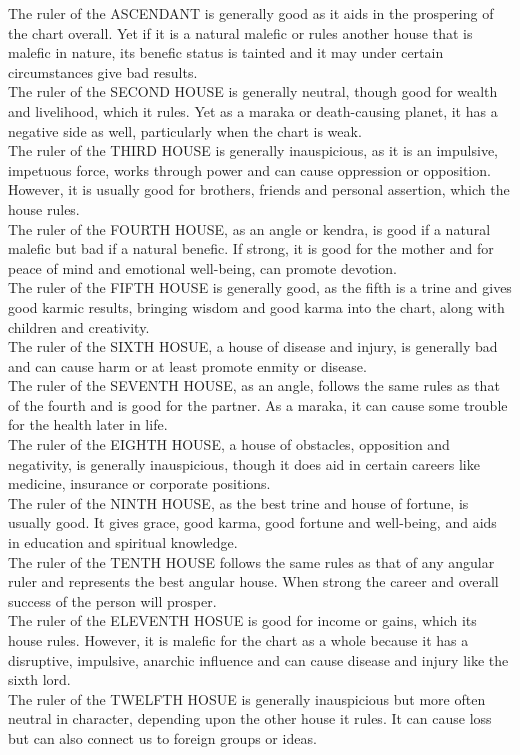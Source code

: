 The ruler of the ASCENDANT is generally good as it aids in the prospering of the chart overall. Yet if it is a natural malefic or rules another house that is malefic in nature, its benefic status is tainted and it may under certain circumstances give bad results. \\
The ruler of the SECOND HOUSE is generally neutral, though good for wealth and livelihood, which it rules. Yet as a maraka or death-causing planet, it has a negative side as well, particularly when the chart is weak.\\
The ruler of the THIRD HOUSE is generally inauspicious, as it is an impulsive, impetuous force, works through power and can cause oppression or opposition. However, it is usually good for brothers, friends and personal assertion, which the house rules.\\
The ruler of the FOURTH HOUSE, as an angle or kendra, is good if a natural malefic but bad if a natural benefic.  If strong, it is good for the mother and for peace of mind and emotional well-being, can promote devotion.\\
The ruler of the FIFTH HOUSE is generally good, as the fifth is a trine and gives good karmic results, bringing wisdom and good karma into the chart, along with children and creativity.\\
The ruler of the SIXTH HOSUE, a house of disease and injury, is generally bad and can cause harm or at least promote enmity or disease.\\
The ruler of the SEVENTH HOUSE, as an angle, follows the same rules as that of the fourth and is good for the partner. As a maraka, it can cause some trouble for the health later in life.\\
The ruler of the EIGHTH HOUSE, a house of obstacles, opposition and negativity, is generally inauspicious, though it does aid in certain careers like medicine, insurance or corporate positions.\\
The ruler of the NINTH HOUSE, as the best trine and house of fortune, is usually good. It gives grace, good karma, good fortune and well-being, and aids in education and spiritual knowledge.\\
The ruler of the TENTH HOUSE follows the same rules as that of any angular ruler and represents the best angular house. When strong the career and overall success of the person will prosper.\\
The ruler of the ELEVENTH HOSUE is good for income or gains, which its house rules. However, it is malefic for the chart as a whole because it has a disruptive, impulsive, anarchic influence and can cause disease and injury like the sixth lord.\\
The ruler of the TWELFTH HOSUE is generally inauspicious but more often neutral in character, depending upon the other house it rules. It can cause loss but can also connect us to foreign groups or ideas.\\
 

